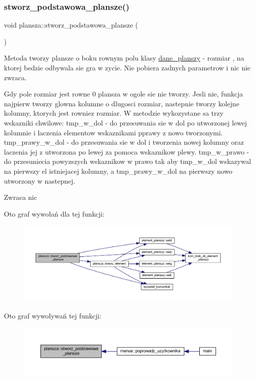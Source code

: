 \subsubsection{\texorpdfstring{stworz\+\_\+podstawowa\+\_\+plansze()}{stworz\_podstawowa\_plansze()}}
{\footnotesize\ttfamily void plansza\+::stworz\+\_\+podstawowa\+\_\+plansze (\begin{DoxyParamCaption}{ }\end{DoxyParamCaption})}

Metoda tworzy plansze o boku rownym polu klasy \mbox{\hyperlink{classdane__planszy}{dane\+\_\+planszy}} -\/ rozmiar , na ktorej bedzie odbywala sie gra w zycie. Nie pobiera zadnych parametrow i nic nie zwraca.

Gdy pole rozmiar jest rowne 0 plansza w ogole sie nie tworzy. Jesli nie, funkcja najpierw tworzy glowna kolumne o dlugosci rozmiar, nastepnie tworzy kolejne kolumny, ktorych jest rowniez rozmiar. W metodzie wykozystane sa trzy wskazniki chwilowe\+: tmp\+\_\+w\+\_\+dol -\/ do przesuwania sie w dol po utworzonej lewej kolumnie i laczenia elementow wskaznikami pprawy z nowo tworzonymi. tmp\+\_\+prawy\+\_\+w\+\_\+dol -\/ do przesuwania sie w dol i tworzenia nowej kolumny oraz laczenia jej z utworzona po lewej za pomoca wskaznikow plewy. tmp\+\_\+w\+\_\+prawo -\/ do przesuniecia powyzszych wskaznikow w prawo tak aby tmp\+\_\+w\+\_\+dol wskazywal na pierwszy el istniejacej kolumny, a tmp\+\_\+prawy\+\_\+w\+\_\+dol na pierwszy nowo utworzony w nastepnej. \begin{DoxyReturn}{Zwraca}
nic 
\end{DoxyReturn}
Oto graf wywołań dla tej funkcji\+:
\nopagebreak
\begin{figure}[H]
\begin{center}
\leavevmode
\includegraphics[width=350pt]{classplansza_a560279ec20a1cd126141f27f5f177a2c_cgraph}
\end{center}
\end{figure}
Oto graf wywoływań tej funkcji\+:
\nopagebreak
\begin{figure}[H]
\begin{center}
\leavevmode
\includegraphics[width=350pt]{classplansza_a560279ec20a1cd126141f27f5f177a2c_icgraph}
\end{center}
\end{figure}
